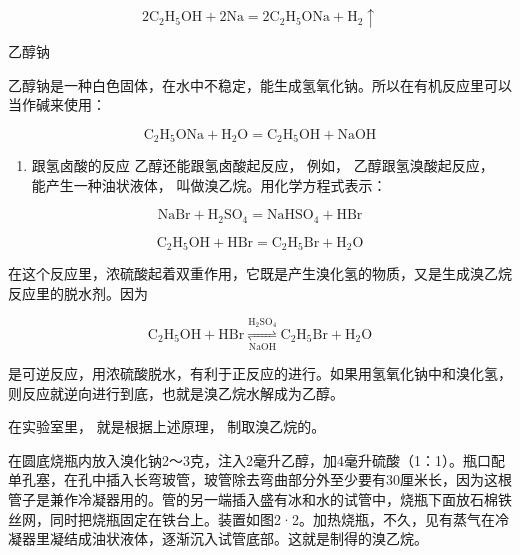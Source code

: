\[
2 \mathrm{C} _ {2} \mathrm{H} _ {5} \mathrm{OH} + 2 \mathrm{Na} = 2 \mathrm{C} _ {2} \mathrm{H} _ {5} \mathrm{ONa} + \mathrm{H} _ {2} \uparrow
\]

乙醇钠

乙醇钠是一种白色固体，在水中不稳定，能生成氢氧化钠。所以在有机反应里可以当作碱来使用：

\[
\mathrm{C} _ {2} \mathrm{H} _ {5} \mathrm{ONa} + \mathrm{H} _ {2} \mathrm{O} = \mathrm{C} _ {2} \mathrm{H} _ {5} \mathrm{OH} + \mathrm{NaOH}
\]

\begin{enumerate}[start=3]
\item
  跟氢卤酸的反应 乙醇还能跟氢卤酸起反应， 例如， 乙醇跟氢溴酸起反应，
  能产生一种油状液体， 叫做溴乙烷。用化学方程式表示：
\end{enumerate}

\[
\mathrm{NaBr} + \mathrm{H} _ {2} \mathrm{SO} _ {4} = \mathrm{NaHSO} _ {4} + \mathrm{HBr}
\]

\[
\mathrm{C} _ {2} \mathrm{H} _ {5} \boxed {\mathrm{OH} + \mathrm{H}} \mathrm{Br} = \mathrm{C} _ {2} \mathrm{H} _ {5} \mathrm{Br} + \mathrm{H} _ {2} \mathrm{O}
\]

在这个反应里，浓硫酸起着双重作用，它既是产生溴化氢的物质，又是生成溴乙烷反应里的脱水剂。因为

\[
\mathrm{C}_{2}\mathrm{H}_{5}\mathrm{OH}+\mathrm{HBr}\mathop{\rightleftharpoons}\limits_{\mathrm{NaOH}}^{\mathrm{H}_{2}\mathrm{SO}_{4}}\mathrm{C}_{2}\mathrm{H}_{5}\mathrm{Br}+\mathrm{H}_{2}\mathrm{O}
\]

是可逆反应，用浓硫酸脱水，有利于正反应的进行。如果用氢氧化钠中和溴化氢，则反应就逆向进行到底，也就是溴乙烷水解成为乙醇。

在实验室里， 就是根据上述原理， 制取溴乙烷的。

在圆底烧瓶内放入溴化钠2～3克，注入2毫升乙醇，加4毫升硫酸（1：1）。瓶口配单孔塞，在孔中插入长弯玻管，玻管除去弯曲部分外至少要有30厘米长，因为这根管子是兼作冷凝器用的。管的另一端插入盛有冰和水的试管中，烧瓶下面放石棉铁丝网，同时把烧瓶固定在铁台上。装置如图2·2。加热烧瓶，不久，见有蒸气在冷凝器里凝结成油状液体，逐渐沉入试管底部。这就是制得的溴乙烷。

